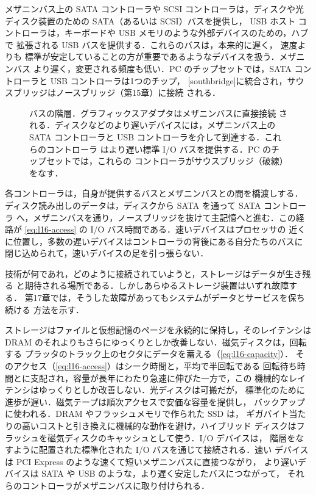 \documentclass[../main.tex]{subfiles}
\begin{document}
メザニンバス上の SATA コントローラや SCSI コントローラは，ディスクや光
ディスク装置のための SATA（あるいは SCSI）バスを提供し，
USB ホスト
コントローラは，キーボードや USB メモリのような外部デバイスのための，ハブで
拡張される USB バスを提供する．これらのバスは，本来的に遅く，
速度よりも
標準が安定していることの方が重要であるようなデバイスを扱う．メザニンバス
より遅く，変更される頻度も低い．PC のチップセットでは，SATA コントローラと
USB コントローラは1つのチップ，%
[southbridge]に統合され，サウスブリッジはノースブリッジ（第15章）に接続
される．

\begin{figure}[htbp]
  \centering
  
  \caption{バスの階層．グラフィックスアダプタはメザニンバスに直接接続
    される．ディスクなどのより遅いデバイスには，メザニンバス上の SATA
    コントローラと USB コントローラを介して到達する．これらのコントローラ
    はより遅い標準 I/O バスを提供する．PC のチップセットでは，これらの
    コントローラがサウスブリッジ（破線）をなす．}
  \label{fig:l16-io-buses}
\end{figure}

各コントローラは，自身が提供するバスとメザニンバスとの間を橋渡しする．
ディスク読み出しのデータは，ディスクから SATA を通って SATA コントローラ
へ，メザニンバスを通り，ノースブリッジを抜けて主記憶へと進む．この経路が
\cref{eq:l16-access} の I/O バス時間である．速いデバイスはプロセッサの
近くに位置し，多数の遅いデバイスはコントローラの背後にある自分たちのバスに
閉じ込められて，速いデバイスの足を引っ張らない．

技術が何であれ，どのように接続されていようと，ストレージはデータが生き残る
と期待される場所である．しかしあらゆるストレージ装置はいずれ故障する．
第17章では，そうした故障があってもシステムがデータとサービスを保ち続ける
方法を示す．

\begin{keypoint}[章のまとめ]
  ストレージはファイルと仮想記憶のページを永続的に保持し，そのレイテンシは
  DRAM のそれよりもさらにゆっくりとしか改善しない．磁気ディスクは，回転する
  プラッタのトラック上のセクタにデータを蓄える（\cref{eq:l16-capacity}）．
  そのアクセス（\cref{eq:l16-access}）はシーク時間と，平均で半回転である
  回転待ち時間とに支配され，容量が長年にわたり急速に伸びた一方で，この
  機械的なレイテンシはゆっくりとしか改善しない．光ディスクは可搬だが，
  標準化のために進歩が遅い．磁気テープは順次アクセスで安価な容量を提供し，
  バックアップに使われる．DRAM やフラッシュメモリで作られた SSD は，
  ギガバイト当たりの高いコストと引き換えに機械的な動作を避け，ハイブリッド
  ディスクはフラッシュを磁気ディスクのキャッシュとして使う．I/O デバイスは，
  階層をなすように配置された標準化された I/O バスを通じて接続される．速い
  デバイスは PCI Express のような速くて短いメザニンバスに直接つながり，
  より遅いデバイスは SATA や USB のような，より遅く安定したバスにつながって，
  それらのコントローラがメザニンバスに取り付けられる．
\end{keypoint}
\end{document}
